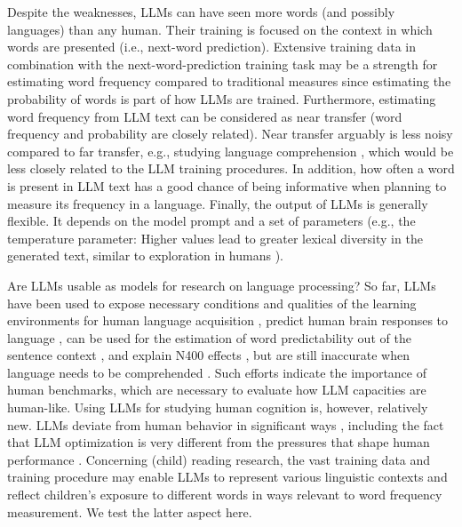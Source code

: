 \documentclass[doc, a4paper]{apa7}
\begin{document}
Despite the weaknesses, LLMs can have seen more words (and possibly languages) than any human. Their training is focused on the context in which words are presented (i.e., next-word prediction). Extensive training data in combination with the next-word-prediction training task may be a strength for estimating word frequency compared to traditional measures since estimating the probability of words is part of how LLMs are trained. Furthermore, estimating word frequency from LLM text can be considered as near transfer (word frequency and probability are closely related). Near transfer arguably is less noisy compared to far transfer, e.g., studying language comprehension \citep{Dentella_2024}, which would be less closely related to the LLM training procedures. In addition, how often a word is present in LLM text has a good chance of being informative when planning to measure its frequency in a language. Finally, the output of LLMs is generally flexible. It depends on the model prompt and a set of parameters (e.g., the temperature parameter: Higher values lead to greater lexical diversity in the generated text, similar to exploration in humans \citep{momennejad_evaluating_2023}). 



Are LLMs usable as models for research on language processing? So far, LLMs have been used to expose necessary conditions and qualities of the learning environments for human language acquisition \citep{warstadt_findings_2023, trott_large_2023}, predict human brain responses to language \citep{tuckute_driving_2024}, can be used for the estimation of word predictability out of the sentence context \citep{hofmann_language_2022, chandra_synthetic_2023, heilbron_prediction_2021}, and explain N400 effects \citep{michaelov_strong_2024}, but are still inaccurate when language needs to be comprehended \citep{Dentella_2024}. Such efforts indicate the importance of human benchmarks, which are necessary to evaluate how LLM capacities are human-like. Using LLMs for studying human cognition is, however, relatively new. LLMs deviate from human behavior in significant ways \citep{mahowald_dissociating_2024}, including the fact that LLM optimization is very different from the pressures that shape human performance \citep{mccoy_embers_2023}. Concerning (child) reading research, the vast training data and training procedure may enable LLMs to represent various linguistic contexts and reflect children's exposure to different words in ways relevant to word frequency measurement. We test the latter aspect here. 
\end{document}
